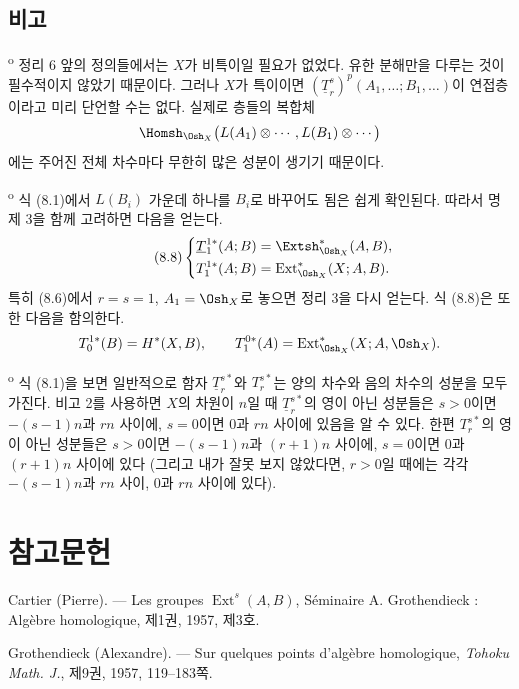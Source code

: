 \subsection*{비고}

\textsuperscript{o} 정리 6 앞의 정의들에서는 $X$가
비특이일 필요가 없었다. 유한 분해만을 다루는 것이 필수적이지 않았기
때문이다. 그러나 $X$가 특이이면
$(\underline{T}_{r}^{s})^{p}(A_1,\ldots;B_1,\ldots)$이 연접층이라고
미리 단언할 수는 없다. 실제로 층들의 복합체
\[
  \Homsh_{\Osh_X}\bigl(L(A_1)\otimes\cdots,L(B_1)\otimes\cdots\bigr)
\]
에는 주어진 전체 차수마다 무한히 많은 성분이 생기기 때문이다.

\medskip
{}\textsuperscript{o} 식 (8.1)에서 $L(B_i)$ 가운데 하나를
$B_i$로 바꾸어도 됨은 쉽게 확인된다. 따라서 명제 3을 함께 고려하면
다음을 얻는다.
\begin{equation}\tag{8.8}
\left\{
\begin{aligned}
  \underline{T}_{1}^{1*}(A;B)&=\Extsh_{\Osh_X}^{*}(A,B),\\
  T_{1}^{1*}(A;B)&=\operatorname{Ext}_{\Osh_X}^{*}(X;A,B).
\end{aligned}
\right.
\end{equation}
특히 (8.6)에서 $r=s=1$, $A_1=\Osh_X$로 놓으면 정리 3을 다시 얻는다.
식 (8.8)은 또한 다음을 함의한다.
\[
  T_{0}^{1*}(B)=H^{*}(X,B),
  \qquad
  T_{1}^{0*}(A)=\operatorname{Ext}_{\Osh_X}^{*}(X;A,\Osh_X).
\]

\medskip
{}\textsuperscript{o} 식 (8.1)을 보면 일반적으로 함자
$\underline{T}_{r}^{s*}$와 $T_{r}^{s*}$는 양의 차수와 음의 차수의
성분을 모두 가진다. 비고 2를 사용하면 $X$의 차원이 $n$일 때
$\underline{T}_{r}^{s*}$의 영이 아닌 성분들은 $s>0$이면
$-(s-1)n$과 $rn$ 사이에, $s=0$이면 $0$과 $rn$ 사이에 있음을 알 수
있다. 한편 $T_{r}^{s*}$의 영이 아닌 성분들은 $s>0$이면
$-(s-1)n$과 $(r+1)n$ 사이에, $s=0$이면 $0$과 $(r+1)n$ 사이에 있다
(그리고 내가 잘못 보지 않았다면, $r>0$일 때에는 각각
$-(s-1)n$과 $rn$ 사이, $0$과 $rn$ 사이에 있다).

\section*{참고문헌}

\noindent[1] Cartier (Pierre). --- Les groupes
$\operatorname{Ext}^{s}(A,B)$, Séminaire A. Grothendieck : Algèbre homologique,
제1권, 1957, 제3호.

\noindent[2] Grothendieck (Alexandre). --- Sur quelques points d'algèbre
homologique, \emph{Tohoku Math. J.}, 제9권, 1957, 119--183쪽.

